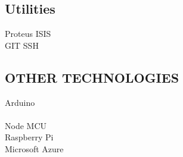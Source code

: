 \documentclass[]{deedy-resume-openfont}
\begin{document}
\begin{minipage}[t]{0.30\textwidth}
\subsection{Utilities}
\textbullet{} Proteus ISIS \\
\textbullet{} GIT \textbullet{} SSH
\subsection{OTHER TECHNOLOGIES}
\textbullet{} Arduino\\
\\
\textbullet{}Node MCU\\
\textbullet{} Raspberry Pi\\
\textbullet{}Microsoft Azure

%
%

\end{minipage} 
\hfill
\end{document}
